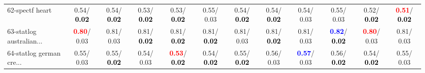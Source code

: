 \begin{table}[h]
\begin{center}
{\begin{tabular}{lc|c|c|c|c|c|c|c|c|c|c}
62-spectf heart &   0.54/\textcolor{black}{\textbf{  0.02}} &   0.54/\textcolor{black}{\textbf{  0.02}} &   0.53/\textcolor{black}{\textbf{  0.02}} &   0.53/\textcolor{black}{\textbf{  0.02}} &   0.55/  0.03 &   0.54/\textcolor{black}{\textbf{  0.02}} &   0.54/\textcolor{black}{\textbf{  0.02}} &   0.54/  0.03 &   0.55/  0.03 &   0.52/\textcolor{black}{\textbf{  0.02}} & \textcolor{red}{\textbf{  0.51}}/\textcolor{black}{\textbf{  0.02}} \\
63-statlog australian... & \textcolor{red}{\textbf{  0.80}}/  0.03 &   0.81/  0.03 &   0.81/\textcolor{black}{\textbf{  0.02}} &   0.81/\textcolor{black}{\textbf{  0.02}} &   0.81/\textcolor{black}{\textbf{  0.02}} &   0.81/  0.03 &   0.81/\textcolor{black}{\textbf{  0.02}} &   0.81/  0.03 & \textcolor{blue}{\textbf{  0.82}}/\textcolor{black}{\textbf{  0.02}} & \textcolor{red}{\textbf{  0.80}}/  0.03 &   0.81/  0.03 \\
64-statlog german cre... &   0.55/  0.03 &   0.55/\textcolor{black}{\textbf{  0.02}} &   0.54/  0.03 & \textcolor{red}{\textbf{  0.53}}/\textcolor{black}{\textbf{  0.02}} &   0.54/\textcolor{black}{\textbf{  0.02}} &   0.55/\textcolor{black}{\textbf{  0.02}} &   0.56/  0.03 & \textcolor{blue}{\textbf{  0.57}}/  0.03 &   0.56/\textcolor{black}{\textbf{  0.02}} &   0.54/\textcolor{black}{\textbf{  0.02}} &   0.55/  0.03 \\\end{tabular}
}\label{strats1bSVM}
\end{center}
\end{table}
